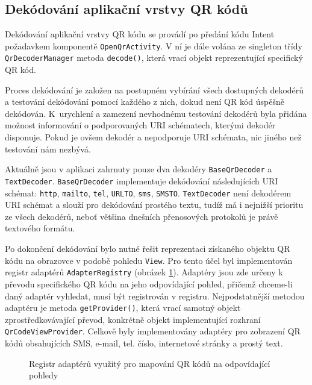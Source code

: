 \subsection{Dekódování aplikační vrstvy QR kódů}
\label{aplikaceDekodovani}

Dekódování aplikační vrstvy QR kódu se provádí po předání kódu Intent požadavkem 
komponentě \texttt{OpenQrActivity}. V ní je dále volána ze singleton třídy
\texttt{QrDecoderManager} metoda \texttt{decode()}, která vrací objekt
reprezentující specifický QR kód.

Proces dekódování je založen na postupném vybírání všech dostupných dekodérů a
testování dekódování pomocí každého z nich, dokud není QR kód úspěšně dekódován.
K~urychlení a zamezení nevhodnému testování dekodérů byla přidána možnost
informování o podporovaných URI schématech, kterými dekodér disponuje. Pokud je
ovšem dekodér  a nepodporuje URI schémata, nic jiného než
testování nám nezbývá.

Aktuálně jsou v aplikaci zahrnuty pouze dva dekodéry
\texttt{BaseQrDecoder} a \texttt{TextDecoder}. \texttt{BaseQrDecoder}
implementuje dekódování následujících URI schémat: \texttt{http},
\texttt{mailto}, \texttt{tel}, \texttt{URLTO}, \texttt{sms}, \texttt{SMSTO}.
\texttt{TextDecoder} není dekodérem URI schémat a slouží pro dekódování prostého
textu, tudíž má i nejnižší prioritu ze všech dekodérů, neboť většina dnešních
přenosových protokolů je právě textového formátu.

Po dokončení dekódování bylo nutné řešit reprezentaci získaného objektu QR kódu
na obrazovce v podobě pohledu \texttt{View}. Pro tento účel byl implementován
registr adaptérů \texttt{AdapterRegistry} (obrázek \ref{adapterPattern}). Adaptéry jsou
zde určeny k převodu specifického QR kódu na jeho odpovídající pohled, přičemž chceme-li daný
adaptér vyhledat, musí být registrován v registru. Nejpodstatnější metodou
adaptéru je metoda \texttt{getProvider()}, která vrací samotný objekt
zprostředkovávající převod, konkrétně objekt implementující rozhraní
\texttt{QrCodeViewProvider}. Celkově byly implementovány adaptéry pro zobrazení
QR kódů obsahujících SMS, e-mail, tel. číslo, internetové stránky a prostý
text.
 
 \begin{figure}[H]
  \begin{center}
    \caption{Registr adaptérů využitý pro mapování QR kódů na odpovídající
    pohledy}
    \label{adapterPattern}
  \end{center}
\end{figure}
 
